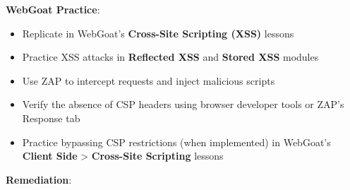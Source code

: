 \documentclass[]{UCD_CS_FYP_Report}
\begin{document}
\textbf{WebGoat Practice}:
\begin{itemize}
    \item Replicate in WebGoat's \textbf{Cross-Site Scripting (XSS)} lessons
    \item Practice XSS attacks in \textbf{Reflected XSS} and \textbf{Stored XSS} modules
    \item Use ZAP to intercept requests and inject malicious scripts
    \item Verify the absence of CSP headers using browser developer tools or ZAP's Response tab
    \item Practice bypassing CSP restrictions (when implemented) in WebGoat's \textbf{Client Side} > \textbf{Cross-Site Scripting} lessons
\end{itemize}

\textbf{Remediation}:
\end{document}
